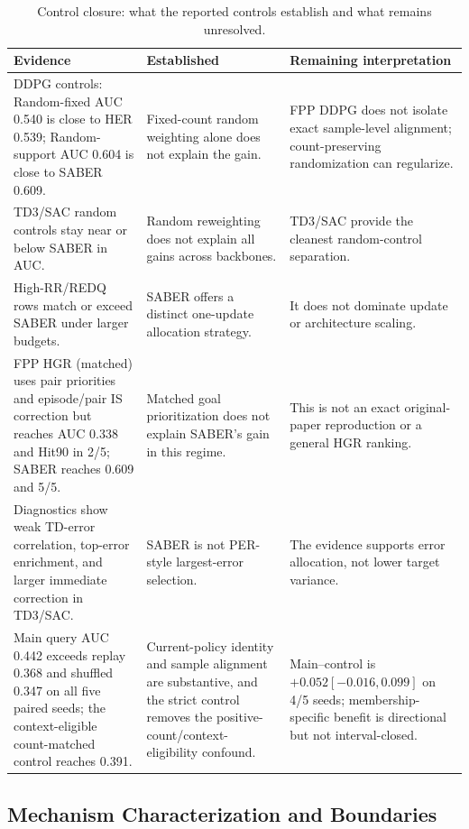 \documentclass[letterpaper]{article}
\begin{document}
\begin{table}[t]
\centering
\small
\caption{Control closure: what the reported controls establish and what remains unresolved.}
\label{tab:closure-submission}
\begin{tabular}{p{}p{}p{}}
\toprule
Evidence & Established & Remaining interpretation \\
\midrule
DDPG controls: Random-fixed AUC 0.540 is close to HER 0.539; Random-support AUC 0.604 is close to SABER 0.609. &
Fixed-count random weighting alone does not explain the gain. &
FPP DDPG does not isolate exact sample-level alignment; count-preserving randomization can regularize. \\
\addlinespace
TD3/SAC random controls stay near or below SABER in AUC. &
Random reweighting does not explain all gains across backbones. &
TD3/SAC provide the cleanest random-control separation. \\
\addlinespace
High-RR/REDQ rows match or exceed SABER under larger budgets. &
SABER offers a distinct one-update allocation strategy. &
It does not dominate update or architecture scaling. \\
\addlinespace
FPP HGR (matched) uses pair priorities and episode/pair IS correction but reaches AUC 0.338 and Hit90 in 2/5; SABER reaches 0.609 and 5/5. &
Matched goal prioritization does not explain SABER's gain in this regime. &
This is not an exact original-paper reproduction or a general HGR ranking. \\
\addlinespace
Diagnostics show weak TD-error correlation, top-error enrichment, and larger immediate correction in TD3/SAC. &
SABER is not PER-style largest-error selection. &
The evidence supports error allocation, not lower target variance. \\
\addlinespace
Main query AUC 0.442 exceeds replay 0.368 and shuffled 0.347 on all five paired seeds; the context-eligible count-matched control reaches 0.391. &
Current-policy identity and sample alignment are substantive, and the strict control removes the positive-count/context-eligibility confound. &
Main--control is \(+0.052[-0.016,0.099]\) on 4/5 seeds; membership-specific benefit is directional but not interval-closed. \\
\bottomrule
\end{tabular}
\end{table}

\FloatBarrier
\raggedbottom
\subsection{Mechanism Characterization and Boundaries}
\end{document}
